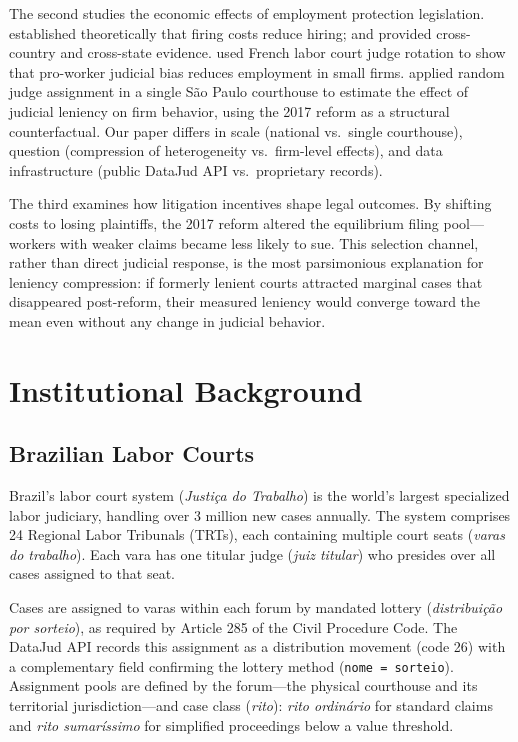 \documentclass[12pt]{article}
\begin{document}
The second studies the economic effects of employment protection legislation. \citet{lazear1990} established theoretically that firing costs reduce hiring; \citet{besley2004} and \citet{autor2006} provided cross-country and cross-state evidence. \citet{cahuc2024} used French labor court judge rotation to show that pro-worker judicial bias reduces employment in small firms. \citet{corbi2022} applied random judge assignment in a single S\~{a}o Paulo courthouse to estimate the effect of judicial leniency on firm behavior, using the 2017 reform as a structural counterfactual. Our paper differs in scale (national vs.\ single courthouse), question (compression of heterogeneity vs.\ firm-level effects), and data infrastructure (public DataJud API vs.\ proprietary records).

The third examines how litigation incentives shape legal outcomes. By shifting costs to losing plaintiffs, the 2017 reform altered the equilibrium filing pool---workers with weaker claims became less likely to sue. This selection channel, rather than direct judicial response, is the most parsimonious explanation for leniency compression: if formerly lenient courts attracted marginal cases that disappeared post-reform, their measured leniency would converge toward the mean even without any change in judicial behavior.

\section{Institutional Background}

\subsection{Brazilian Labor Courts}

Brazil's labor court system (\textit{Justi\c{c}a do Trabalho}) is the world's largest specialized labor judiciary, handling over 3 million new cases annually. The system comprises 24 Regional Labor Tribunals (TRTs), each containing multiple court seats (\textit{varas do trabalho}). Each vara has one titular judge (\textit{juiz titular}) who presides over all cases assigned to that seat.

Cases are assigned to varas within each forum by mandated lottery (\textit{distribui\c{c}\~{a}o por sorteio}), as required by Article 285 of the Civil Procedure Code. The DataJud API records this assignment as a distribution movement (code 26) with a complementary field confirming the lottery method (\texttt{nome = sorteio}). Assignment pools are defined by the forum---the physical courthouse and its territorial jurisdiction---and case class (\textit{rito}): \textit{rito ordin\'{a}rio} for standard claims and \textit{rito sumar\'{i}ssimo} for simplified proceedings below a value threshold.
\end{document}
